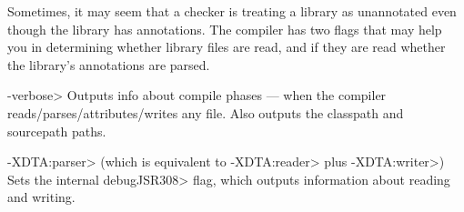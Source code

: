 
Sometimes, it may seem that a checker is treating a library as unannotated
even though the library has annotations.  The compiler has two flags that
may help you in determining whether library files are read, and if they are
read whether the library's annotations are parsed.

\begin{description}
\item \<-verbose>
  Outputs info about compile phases --- when the compiler
  reads/parses/attributes/writes any file.  Also outputs the classpath and
  sourcepath paths.
\item \<-XDTA:parser> (which is equivalent to \<-XDTA:reader> plus \<-XDTA:writer>)
  Sets the internal \<debugJSR308> flag, which outputs information about
  reading and writing.
\end{description}


